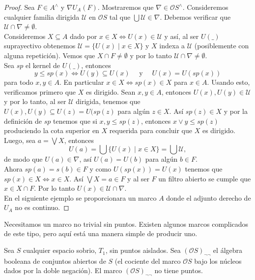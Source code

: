 \begin{proof}
    Sea $F\in A^\wedge$ y $\nabla U_A(F)$. Mostraremos que $\nabla\in \mathcal{O}S^\wedge$. Consideremos cualquier familia dirigida $\mathcal{U}$ en $\mathcal{O}S$ tal que $\bigcup\mathcal{U}\in \nabla$. Debemos verificar que $\mathcal{U}\cap \nabla\neq \emptyset$.\\

    Consideremos $X\subseteq A$ dado por $x\in X\Leftrightarrow U(x)\in \mathcal{U}$ y así, al ser $U( \_ )$ suprayectivo obtenemos $\mathcal{U}=\{U(x)\mid x\in X\}$ y $X$ indexa a $\mathcal{U}$ (posiblemente con alguna repetición). Vemos que $X\cap F\neq \emptyset$ y por lo tanto $\mathcal{U}\cap \nabla\neq \emptyset$.\\

    Sea $sp$ el kernel de $U( \_ )$, entonces
    \[
    y\leq sp(x)\Leftrightarrow U(y)\subseteq U(x)\quad \mbox{ y }\quad U(x)=U(sp(x))
    \]
    para todo $x, y \in A$. En particular $x\in X\Leftrightarrow sp(x)\in X$ para $x\in A$. Usando esto, verificamos primero que $X$ es dirigido. Sean $x, y\in A$, entonces $U(x), U(y)\in \mathcal{U}$ y por lo tanto, al ser $\mathcal{U}$ dirigida, tenemos que $U(x), U(y)\subseteq U(z)=U(sp(z)$ para algún $z\in X$. Así $sp(z)\in X$ y por la definición de $sp$ tenemos que si $x, y\leq sp(z)$, entonces $x\vee y\leq sp(z)$ produciendo la cota superior en $X$ requerida para concluir que $X$ es dirigido.\\

    Luego, sea $a=\bigvee X$, entonces 
    \[
    U(a)=\bigcup\{U(x)\mid x\in X\}=\bigcup \mathcal{U},
    \]
    de modo que $U(a)\in \nabla$, así $U(a)=U(b)$ para algún $b\in  F$.\\
    
    Ahora $sp(a)=s(b)\in F$ y como $U(sp(x))=U(x)$ tenemos que $sp(x)\in X\Leftrightarrow x\in X$. Así $\bigvee X=a\in F$ y al ser $F$ un filtro abierto se cumple que $x\in X\cap F$. Por lo tanto $U(x)\in \mathcal{U}\cap \nabla$.\\

    En el siguiente ejemplo se proporcionara un marco $A$ donde el adjunto derecho de $U_A$ no es continuo.
\end{proof}

Necesitamos un marco no trivial sin puntos. Existen algunos marcos complicados de este tipo, pero aquí está una manera simple de producir uno.

\begin{lem}\label{Lema7.2.6}
    Sea $S$ cualquier espacio sobrio, $T_1$, sin puntos aislados. Sea $(\mathcal{O}S)_{\neg\neg}$ el álgebra booleana de conjuntos abiertos de $S$ (el cociente del marco $\mathcal{O}S$ bajo los núcleos dados por la doble negación). El marco $(\mathcal{O}S)_{\neg\neg}$ no tiene puntos.
\end{lem}

